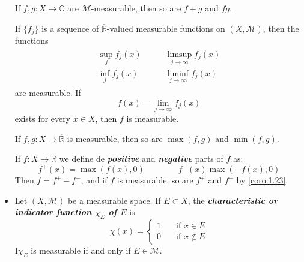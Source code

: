 \documentclass{article}
\theoremstyle{definition}
\numberwithin{equation}{section}
\newcommand{\R}{\mathbb{R}}
\newcommand{\C}{\mathbb{C}}
\begin{document}
\begin{itemize}
			\begin{prop}
				If $f,g:X\to\C$ are $\mathcal{M}$-measurable, then so are $f+g$ and $fg$.
			\end{prop}
			\begin{prop}
				If $\{f_j\}$ is a sequence of $\overline{\R}$-valued measurable functions on $(X,\mathcal{M})$, then the functions
				\begin{align*}
					\begin{aligned}
						\sup_jf_j(x)\\
						\inf_jf_j(x)
					\end{aligned}\qquad
					\begin{aligned}
						\limsup_{j\to\infty}f_j(x)\\
						\liminf_{j\to\infty}f_j(x)
					\end{aligned}
				\end{align*}
				are measurable. If
				\[f(x)=\lim_{j\to\infty}f_j(x)\]
				exists for every $x\in X$, then $f$ is measurable.
			\end{prop}
			\begin{coro}\label{coro:1.23}
				If $f,g:X\to\overline{\R}$ is measurable, then so are $\max(f,g)$ and $\min(f,g)$.
			\end{coro}
			If $f:X\to\overline{\R}$ we define de \textbf{\textit{positive}} and \textbf{\textit{negative}} parts of $f$ as:
			\[f^+(x)=\max(f(x),0)\qquad\qquad f^-(x)\max(-f(x),0)\]
			Then $f=f^+-f^-$, and if $f$ is measurable, so are $f^+$ and $f^-$ by \cref{coro:1.23}.
			
		\item Let $(X,\mathcal{M})$ be a measurable space. If $E\subset X$, the \textbf{\textit{characteristic or indicator function $\chi_E$ of $E$}} is
		\[\chi(x)=\begin{cases}
			1\quad&\text{if }x\in E\\
			0\quad&\text{if }x\notin E
		\end{cases}\]
		I$\chi_E$ is measurable if and only if $E\in\mathcal{M}$.
		

\end{itemize}
\end{document}
